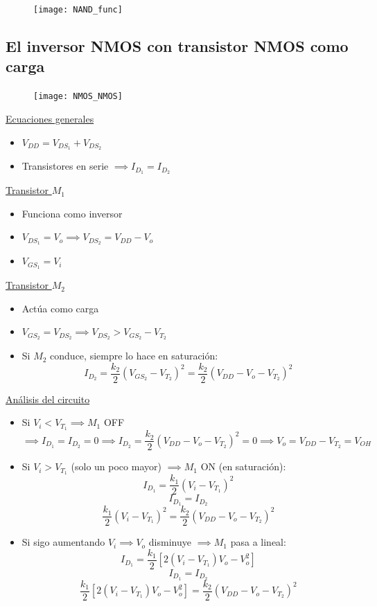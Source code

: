 \documentclass[10pt,a4paper]{article}
\begin{document}
	\begin{figure}[h]
		\centering
		\texttt{[image: NAND\_func]}
	\end{figure}

	\subsection{El inversor NMOS con transistor NMOS como carga}
	
	\begin{figure}[h]
		\centering
		\texttt{[image: NMOS\_NMOS]}
	\end{figure}
	
	\underline{Ecuaciones generales}
	\begin{itemize}
		\item $V_{DD} = V_{DS_1} + V_{DS_2}$
		\item Transistores en serie $\implies I_{D_1} = I_{D_2}$
	\end{itemize}
	\underline{Transistor $M_1$}
	\begin{itemize}
		\item Funciona como inversor
		\item $V_{DS_1} = V_o \implies V_{DS_2} = V_{DD} - V_o$
		\item $V_{GS_1} = V_i$
	\end{itemize}
	\underline{Transistor $M_2$}
	\begin{itemize}
		\item Actúa como carga
		\item $V_{GS_2} = V_{DS_2} \implies V_{DS_2} > V_{GS_2} - V_{T_2}$
		\item Si $M_2$ conduce, siempre lo hace en saturación:
		$$I_{D_2} = \dfrac{k_2}{2}(V_{GS_2} - V_{T_2})^2 = \dfrac{k_2}{2}(V_{DD} - V_o - V_{T_2})^2$$
	\end{itemize}
	
	\underline{Análisis del circuito}
	\begin{itemize}
		\item Si $V_i < V_{T_1} \implies M_1$ OFF $\implies I_{D_1} = I_{D_2} = 0 \implies I_{D_2} = \dfrac{k_2}{2}(V_{DD} - V_o - V_{T_2})^2 = 0 \implies V_o = V_{DD} - V_{T_2} = V_{OH}$
		\item Si $V_i > V_{T_1}$ (solo un poco mayor) $\implies M_1$ ON (en saturación):
		$$I_{D_1} = \dfrac{k_1}{2}(V_i - V_{T_1})^2$$
		$$I_{D_1} = I_{D_2}$$
		$$\dfrac{k_1}{2}(V_i - V_{T_1})^2 = \dfrac{k_2}{2}(V_{DD} - V_o - V_{T_2})^2$$
		\item Si sigo aumentando $V_i \implies V_o$ disminuye $\implies M_1$ pasa a lineal:
		$$I_{D_1} = \dfrac{k_1}{2}[2(V_i - V_{T_1})V_o - V_o^2]$$
		$$I_{D_1} = I_{D_2}$$
		$$\dfrac{k_1}{2}[2(V_i - V_{T_1})V_o - V_o^2] = \dfrac{k_2}{2}(V_{DD} - V_o - V_{T_2})^2$$
	\end{itemize}
\end{document}
